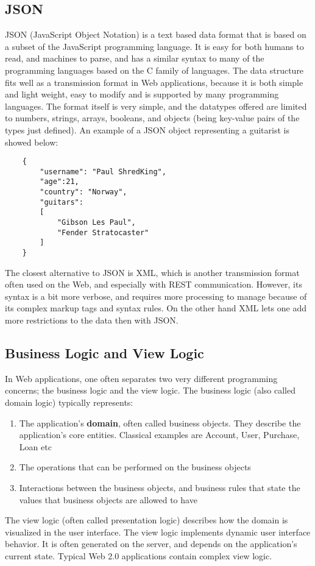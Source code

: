 \subsection{JSON}
JSON\cite{json} (JavaScript Object Notation) is a text based data format that is based on a subset of the JavaScript programming language. It is easy for both humans to read, and machines to parse, and has a similar syntax to many of the programming languages based on the C family of languages. The data structure fits well as a transmission format in Web applications, because it is both simple and light weight, easy to modify and is supported by many programming languages. The format itself is very simple, and the datatypes offered are limited to numbers, strings, arrays, booleans, and objects (being key-value pairs of the types just defined). An example of a JSON object representing a guitarist is showed below:
	\begin{lstlisting}
	{
		"username": "Paul ShredKing",
		"age":21,
		"country": "Norway",
		"guitars": 
		[
			"Gibson Les Paul",
			"Fender Stratocaster"
		]
	}
	\end{lstlisting}
The closest alternative to JSON is XML\cite{xml}, which is another transmission format often used on the Web, and especially with REST communication. However, its syntax is a bit more verbose, and requires more processing to manage because of its complex markup tags and syntax rules. On the other hand XML lets one add more restrictions to the data then with JSON.

\subsection{Business Logic and View Logic}
In Web applications, one often separates two very different programming concerns; the business logic and the view logic. The business logic (also called domain logic) typically represents:
\begin{enumerate}
\item{} The application's \textbf{domain}, often called business objects. They describe the application's core entities. Classical examples are Account, User, Purchase, Loan etc
\item{} The operations that can be performed on the business objects
\item{} Interactions between the business objects, and business rules that state the values that business objects are allowed to have
\end{enumerate}
The view logic (often called presentation logic) describes how the domain is visualized in the user interface. The view logic implements dynamic user interface behavior. It is often generated on the server, and depends on the application's current state. Typical Web 2.0 applications contain complex view logic.

